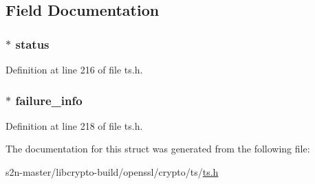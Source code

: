 \subsection{Field Documentation}
\subsubsection[{\texorpdfstring{status}{status}}]{ $\ast$ status}\hypertarget{struct_t_s__status__info__st_a76846a32006dd80ad9ff79af5bbc0f8b}{}\label{struct_t_s__status__info__st_a76846a32006dd80ad9ff79af5bbc0f8b}


Definition at line 216 of file ts.\+h.

\subsubsection[{\texorpdfstring{failure\+\_\+info}{failure_info}}]{ $\ast$ failure\+\_\+info}\hypertarget{struct_t_s__status__info__st_afcc4d40dbe7a8b9f9c52982289fcf813}{}\label{struct_t_s__status__info__st_afcc4d40dbe7a8b9f9c52982289fcf813}


Definition at line 218 of file ts.\+h.



The documentation for this struct was generated from the following file\+:\begin{DoxyCompactItemize}
\item 
s2n-\/master/libcrypto-\/build/openssl/crypto/ts/\hyperlink{crypto_2ts_2ts_8h}{ts.\+h}\end{DoxyCompactItemize}
